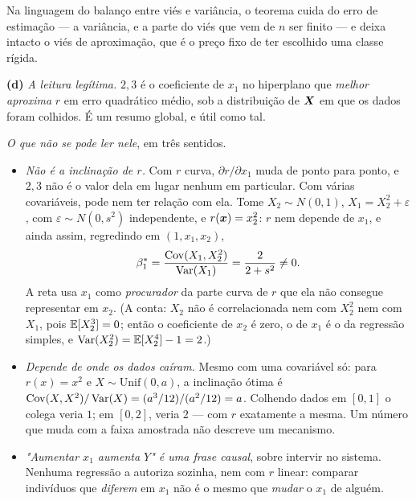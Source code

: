 \begin{solucao}
Na linguagem do balanço entre viés e variância, o teorema cuida do erro de estimação --- a variância, e a
parte do viés que vem de $n$ ser finito --- e deixa intacto o viés de aproximação, que
é o preço fixo de ter escolhido uma classe rígida.

\smallskip
\textbf{(d)} \emph{A leitura legítima.} $2{,}3$ é o coeficiente de $x_1$ no hiperplano
que \emph{melhor aproxima} $r$ em erro quadrático médio, sob a distribuição de $\bm{X}$ em
que os dados foram colhidos. É um resumo global, e útil como tal.

\emph{O que não se pode ler nele}, em três sentidos.
\begin{itemize}[leftmargin=1.2cm]
  \item \emph{Não é a inclinação de $r$.} Com $r$ curva, $\partial r/\partial x_1$ muda
        de ponto para ponto, e $2{,}3$ não é o valor dela em lugar nenhum em
        particular. Com várias covariáveis, pode nem ter relação com ela. Tome
        $X_2\sim N(0,1)$, $X_1=X_2^2+\varepsilon$, com $\varepsilon\sim N(0,s^2)$
        independente, e $r(\bm{x})=x_2^2$: $r$ nem depende de $x_1$, e ainda assim,
        regredindo em $(1,x_1,x_2)$,
        \[
          \beta_1^\ast=\frac{\operatorname{Cov}(X_1,X_2^2)}{\operatorname{Var}(X_1)}=\frac{2}{2+s^2}\neq0 .
        \]
        A reta usa $x_1$ como \emph{procurador} da parte curva de $r$ que ela não
        consegue representar em $x_2$. (A conta: $X_2$ não é correlacionada nem com
        $X_2^2$ nem com $X_1$, pois $\mathbb{E}[X_2^3]=0$; então o coeficiente de $x_2$ é zero,
        o de $x_1$ é o da regressão simples, e $\operatorname{Var}(X_2^2)=\mathbb{E}[X_2^4]-1=2$.)
  \item \emph{Depende de onde os dados caíram.} Mesmo com uma covariável só: para
        $r(x)=x^2$ e $X\sim\mathrm{Unif}(0,a)$, a inclinação ótima é
        $\operatorname{Cov}(X,X^2)/\operatorname{Var}(X)=(a^3/12)/(a^2/12)=a$. Colhendo dados em $[0,1]$ o colega
        veria $1$; em $[0,2]$, veria $2$ --- com $r$ exatamente a mesma. Um número que
        muda com a faixa amostrada não descreve um mecanismo.
  \item \emph{"Aumentar $x_1$ aumenta $Y$" é uma frase causal}, sobre intervir no
        sistema. Nenhuma regressão a autoriza sozinha, nem com $r$ linear: comparar
        indivíduos que \emph{diferem} em $x_1$ não é o mesmo que \emph{mudar} o $x_1$
        de alguém.
\end{itemize}
\end{solucao}
